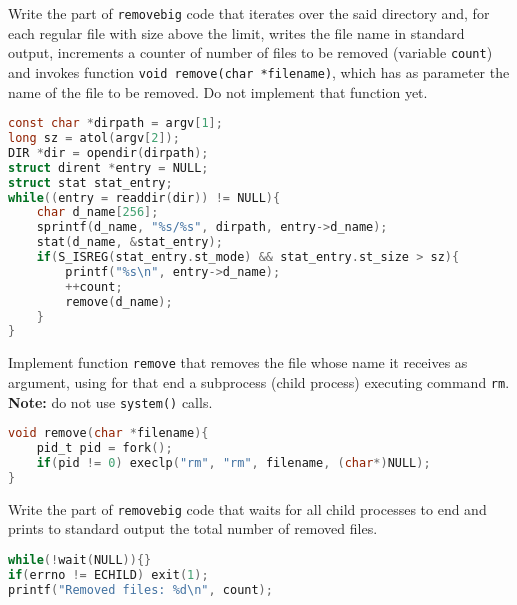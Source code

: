 \documentclass{sope}
\begin{document}
Write the part of \texttt{removebig} code that iterates over the said directory and, for each regular file with size above the limit, writes the file name in standard output, increments a counter of number of files to be removed (variable \texttt{count}) and invokes function \texttt{void remove(char *filename)}, which has as parameter the name of the file to be removed. Do not implement that function yet.

\ansseparator

\begin{lstlisting}[language=C]
const char *dirpath = argv[1];
long sz = atol(argv[2]);
DIR *dir = opendir(dirpath);
struct dirent *entry = NULL;
struct stat stat_entry;
while((entry = readdir(dir)) != NULL){
    char d_name[256];
    sprintf(d_name, "%s/%s", dirpath, entry->d_name);
    stat(d_name, &stat_entry);
    if(S_ISREG(stat_entry.st_mode) && stat_entry.st_size > sz){
        printf("%s\n", entry->d_name);
        ++count;
        remove(d_name);
    }
}
\end{lstlisting}

Implement function \texttt{remove} that removes the file whose name it receives as argument, using for that end a subprocess (child process) executing command \texttt{rm}. \textbf{Note:} do not use \texttt{system()} calls.

\ansseparator

\begin{lstlisting}[language=C]
void remove(char *filename){
    pid_t pid = fork();
    if(pid != 0) execlp("rm", "rm", filename, (char*)NULL);
}
\end{lstlisting}

Write the part of \texttt{removebig} code that waits for all child processes to end and prints to standard output the total number of removed files.

\ansseparator

\begin{lstlisting}[language=C]
while(!wait(NULL)){}
if(errno != ECHILD) exit(1);
printf("Removed files: %d\n", count);
\end{lstlisting}
\end{document}
